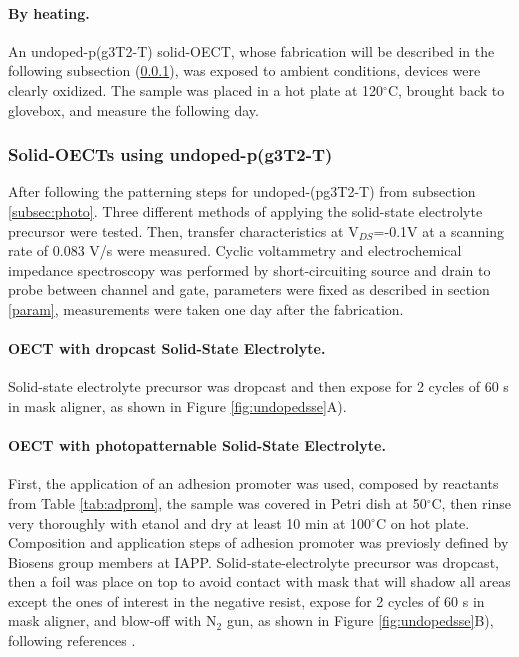 \paragraph{By heating.}An undoped-p(g3T2-T) solid-OECT, whose fabrication will be described in the following subsection (\ref{subsec:solidOECT}), was exposed to ambient conditions, devices were clearly oxidized. The sample was placed in a hot plate at 120$^{\circ}$C, brought back to glovebox, and measure the following day.  %
\subsubsection{Solid-OECTs using undoped-p(g3T2-T)} \label{subsec:solidOECT}
After following the patterning steps for undoped-(pg3T2-T) from subsection \ref{subsec:photo}. Three different methods of applying the solid-state electrolyte precursor were tested. Then, transfer characteristics at V$_{DS}$=-0.1V at a scanning rate of 0.083 V/s were measured. Cyclic voltammetry and electrochemical impedance spectroscopy was performed by short-circuiting source and drain to probe between channel and gate, parameters were fixed as described in section \ref{param}, measurements were taken one day after the fabrication.

\paragraph{OECT with dropcast Solid-State Electrolyte.}Solid-state electrolyte precursor was dropcast and then expose for 2 cycles of 60 s in mask aligner, as shown in Figure \ref{fig:undopedsse}A). 

\paragraph{OECT with photopatternable Solid-State Electrolyte.}First, the application of an adhesion promoter was used, composed by reactants from Table \ref{tab:adprom}, the sample was covered in Petri dish at 50$^{\circ}$C, then rinse very thoroughly with etanol and dry at least 10 min at 100$^{\circ}$C on hot plate. Composition and application steps of adhesion promoter was previosly defined by Biosens group members at IAPP. Solid-state-electrolyte precursor was dropcast, then a foil was place on top to avoid contact with mask that will shadow all areas except the ones of interest in the negative resist, expose for 2 cycles of 60 s in mask aligner, and blow-off with N$_{2}$ gun, as shown in Figure \ref{fig:undopedsse}B),  following references \cite{weissbachPhotopatternableSolidElectrolyte2022}\cite{bongartzOrganicElectrochemicalTransistors2021}.

